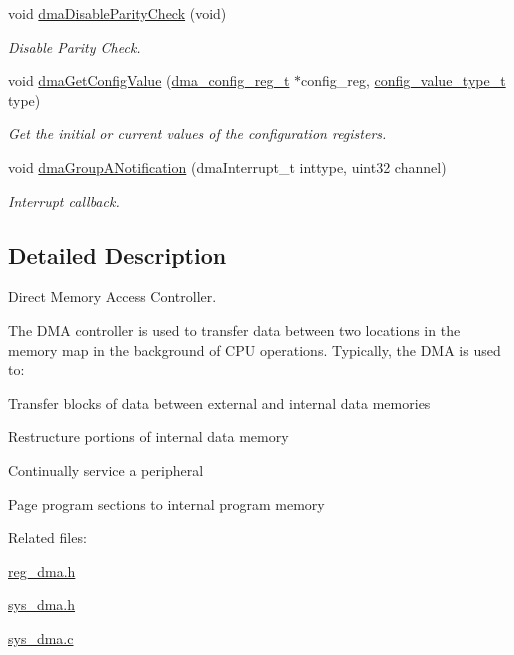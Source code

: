 \begin{DoxyCompactItemize}
void \mbox{\hyperlink{group__DMA_ga279651ad85ea8c9c8d0370f1d14e230b}{dma\+Disable\+Parity\+Check}} (void)
\begin{DoxyCompactList}\small\item\em Disable Parity Check. \end{DoxyCompactList}\item 
void \mbox{\hyperlink{group__DMA_ga3f704ab3357cb4a16b83a98dc405a4dc}{dma\+Get\+Config\+Value}} (\mbox{\hyperlink{structdma__config__reg}{dma\+\_\+config\+\_\+reg\+\_\+t}} $\ast$config\+\_\+reg, \mbox{\hyperlink{sys__common_8h_a9daf9a5992391b058477d28d107ee5e2}{config\+\_\+value\+\_\+type\+\_\+t}} type)
\begin{DoxyCompactList}\small\item\em Get the initial or current values of the configuration registers. \end{DoxyCompactList}\item 
void \mbox{\hyperlink{group__DMA_ga27a1d2fda92f10191a0c54ed6227c22e}{dma\+Group\+A\+Notification}} (dma\+Interrupt\+\_\+t inttype, uint32 channel)
\begin{DoxyCompactList}\small\item\em Interrupt callback. \end{DoxyCompactList}\end{DoxyCompactItemize}


\subsection{Detailed Description}
Direct Memory Access Controller. 

The D\+MA controller is used to transfer data between two locations in the memory map in the background of C\+PU operations. Typically, the D\+MA is used to\+:
\begin{DoxyItemize}
\item Transfer blocks of data between external and internal data memories
\item Restructure portions of internal data memory
\item Continually service a peripheral
\item Page program sections to internal program memory
\end{DoxyItemize}

Related files\+:
\begin{DoxyItemize}
\item \mbox{\hyperlink{reg__dma_8h}{reg\+\_\+dma.\+h}}
\item \mbox{\hyperlink{sys__dma_8h_source}{sys\+\_\+dma.\+h}}
\item \mbox{\hyperlink{sys__dma_8c_source}{sys\+\_\+dma.\+c}} 
\end{DoxyItemize}


